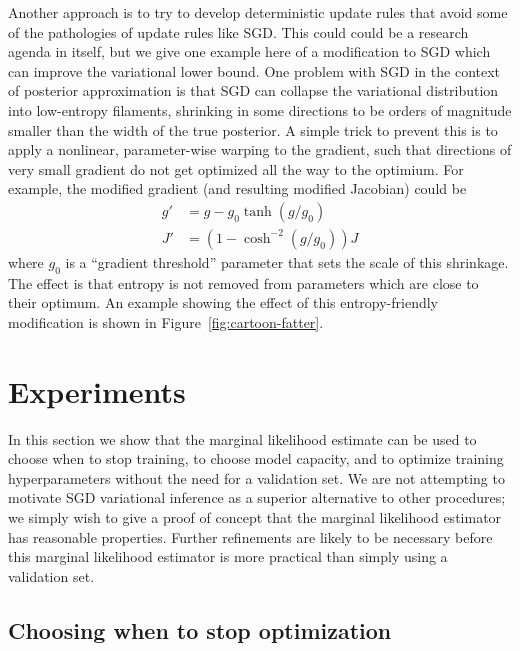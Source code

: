 \documentclass[]{article}
\begin{document}
Another approach is to try to develop deterministic update rules
that avoid some of the pathologies of update rules like SGD.
This could could be a research agenda in itself, but we give one example here of a modification to
SGD which can improve the variational lower bound.
One problem with SGD in the context of posterior approximation is that
SGD can collapse the variational distribution into low-entropy filaments, shrinking in some directions to be orders of magnitude smaller than the width of the true posterior.
A simple trick to prevent this is to apply a nonlinear, parameter-wise warping
to the gradient, such that directions of very small gradient do not get optimized all the way
to the optimium.
For example, the modified gradient (and resulting modified Jacobian) could be
\begin{align}
g' & = g - g_0 \tanh \left(g / g_0 \right) \\
J' & = \left(1 - \cosh^{-2} (g / g_0) \right) J 
\end{align}
where $g_0$ is a ``gradient threshold'' parameter that sets the scale of this shrinkage.
The effect is that entropy is not removed from parameters which are close to their optimum.
An example showing the effect of this entropy-friendly modification is shown in Figure~\ref{fig:cartoon-fatter}.


\section{Experiments}
\label{sec:experiments}

In this section we show that the marginal likelihood estimate can be used to choose when to stop training, to choose model capacity, and to optimize training hyperparameters without the need for a validation set.
We are not attempting to motivate SGD variational inference as a superior alternative to other procedures;
we simply wish to give a proof of concept that the marginal likelihood estimator has reasonable properties.
Further refinements are likely to be necessary before this marginal likelihood estimator is more practical than simply using a validation set.

\subsection{Choosing when to stop optimization}
\end{document}

